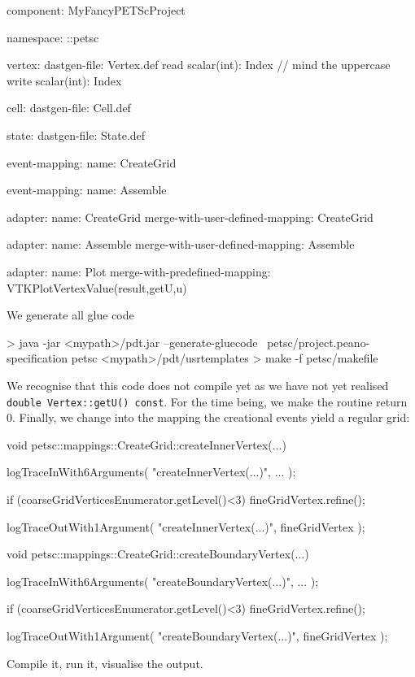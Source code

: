 \begin{code}
component: MyFancyPETScProject

namespace: ::petsc

vertex:
  dastgen-file: Vertex.def
  read scalar(int): Index   // mind the uppercase
  write scalar(int): Index
  
cell:
  dastgen-file: Cell.def

state:
  dastgen-file: State.def

event-mapping:
  name: CreateGrid

event-mapping:
  name: Assemble

adapter:
  name: CreateGrid
  merge-with-user-defined-mapping: CreateGrid

adapter:
  name: Assemble
  merge-with-user-defined-mapping: Assemble
 
adapter:
  name: Plot
  merge-with-predefined-mapping: VTKPlotVertexValue(result,getU,u)
\end{code}

We generate all glue code
\begin{code}
> java -jar <mypath>/pdt.jar --generate-gluecode \
  petsc/project.peano-specification petsc <mypath>/pdt/usrtemplates
> make -f petsc/makefile
\end{code}

\noindent
We recognise that this code does not compile yet as we have not yet realised \texttt{double Vertex::getU() const}.
For the time being, we make the routine return 0.
Finally, we change into the mapping the creational events yield a regular grid:

\begin{code}
void petsc::mappings::CreateGrid::createInnerVertex(...) {
  logTraceInWith6Arguments( "createInnerVertex(...)", ... );

  if (coarseGridVerticesEnumerator.getLevel()<3) {
	fineGridVertex.refine();
  }

  logTraceOutWith1Argument( "createInnerVertex(...)", fineGridVertex );
}


void petsc::mappings::CreateGrid::createBoundaryVertex(...) {
  logTraceInWith6Arguments( "createBoundaryVertex(...)", ... );

  if (coarseGridVerticesEnumerator.getLevel()<3) {
	fineGridVertex.refine();
  }

  logTraceOutWith1Argument( "createBoundaryVertex(...)", fineGridVertex );
}
\end{code}

\noindent
Compile it, run it, visualise the output.



